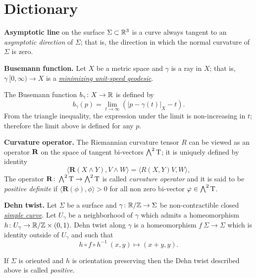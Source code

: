 \chapter{Dictionary}

\begin{description}

\item{\bf Asymptotic line}\label{Asymptotic line} on the surface $\Sigma\subset \mathbb{R}^3$
is a curve always tangent to an \emph{asymptotic direction} of $\Sigma$; 
that is, the direction in which the normal curvature of $\Sigma$ is zero.

\item{\bf Busemann function.}\label{Busemann function} 
Let $X$ be a metric space
and $\gamma$ is a ray in $X$; 
that is, $\gamma\:[0, \infty)\to X$ is a \hyperref[Geodesic]{\emph{minimizing unit-speed geodesic}}.

The Busemann function $b_\gamma\colon X\to\mathbb{R}$ is defined by
$$b_\gamma(p)=\lim_{t\to\infty}\left(|p-\gamma(t)|_X-t\right).$$
From the triangle inequality, 
the expression under the limit is non-increasing in $t$; 
therefore  the limit above is defined for any $p$.

\item{\bf Curvature operator.}\label{Curvature operator}
The Riemannian curvature tensor $R$
can be viewed as an operator $\text{\bf R}$ on the space of tangent bi-vectors $\bigwedge^2 \mathrm{T}$;
it is uniquely defined by identity
$$\langle\mathbf{R}(X\wedge Y),V\wedge W\rangle
=
\langle R(X,Y)V,W\rangle,$$
The operator $\mathbf{R}\colon\bigwedge^2 \mathrm{T}\to \bigwedge^2 \mathrm{T}$ is called \emph{curvature operator} and it is said to be \emph{positive definite} if
$\langle\mathbf{R}(\phi),\phi\rangle>0$ for all non zero
bi-vector $\varphi\in\bigwedge^2 \mathrm{T}$.

\item{\bf Dehn twist.}\label{Dehn twist}
Let $\Sigma$ be a surface and $\gamma\colon\mathbb{R}/\mathbb{Z}\to\Sigma$ be non-contractible closed \hyperref[Simple curve]{\emph{simple curve}}.
Let $U_\gamma$ be a neighborhood of $\gamma$ which admits a homeomorphism $h\colon U_\gamma\to \mathbb{R}/\mathbb{Z}\times (0,1)$.
Dehn twist along $\gamma$ is a homeomorphism $f\:\Sigma\to\Sigma$
which is identity outside of $U_\gamma$ and 
such that
$$h\circ f\circ h^{-1}\:(x,y)\mapsto(x+y,y).$$

If $\Sigma$ is oriented 
and $h$ is orientation preserving
then the Dehn twist described above is called \emph{positive}.


\end{description}
